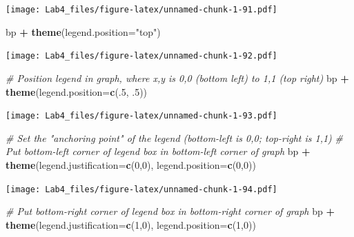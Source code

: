 \documentclass[]{article}
\newenvironment{Shaded}{\begin{snugshade}}{\end{snugshade}}
\newcommand{\KeywordTok}[1]{\textcolor[rgb]{0.13,0.29,0.53}{\textbf{#1}}}
\newcommand{\DataTypeTok}[1]{\textcolor[rgb]{0.13,0.29,0.53}{#1}}
\newcommand{\DecValTok}[1]{\textcolor[rgb]{0.00,0.00,0.81}{#1}}
\newcommand{\StringTok}[1]{\textcolor[rgb]{0.31,0.60,0.02}{#1}}
\newcommand{\CommentTok}[1]{\textcolor[rgb]{0.56,0.35,0.01}{\textit{#1}}}
\newcommand{\OperatorTok}[1]{\textcolor[rgb]{0.81,0.36,0.00}{\textbf{#1}}}
\newcommand{\NormalTok}[1]{#1}
\begin{document}
\texttt{[image: Lab4\_files/figure-latex/unnamed-chunk-1-91.pdf]}

\begin{Shaded}
\begin{Highlighting}[]
\NormalTok{bp }\OperatorTok{+}\StringTok{ }\KeywordTok{theme}\NormalTok{(}\DataTypeTok{legend.position=}\StringTok{"top"}\NormalTok{)}
\end{Highlighting}
\end{Shaded}

\texttt{[image: Lab4\_files/figure-latex/unnamed-chunk-1-92.pdf]}

\begin{Shaded}
\begin{Highlighting}[]
\CommentTok{# Position legend in graph, where x,y is 0,0 (bottom left) to 1,1 (top right)}
\NormalTok{bp }\OperatorTok{+}\StringTok{ }\KeywordTok{theme}\NormalTok{(}\DataTypeTok{legend.position=}\KeywordTok{c}\NormalTok{(.}\DecValTok{5}\NormalTok{, .}\DecValTok{5}\NormalTok{))}
\end{Highlighting}
\end{Shaded}

\texttt{[image: Lab4\_files/figure-latex/unnamed-chunk-1-93.pdf]}

\begin{Shaded}
\begin{Highlighting}[]
\CommentTok{# Set the "anchoring point" of the legend (bottom-left is 0,0; top-right is 1,1)}
\CommentTok{# Put bottom-left corner of legend box in bottom-left corner of graph}
\NormalTok{bp }\OperatorTok{+}\StringTok{ }\KeywordTok{theme}\NormalTok{(}\DataTypeTok{legend.justification=}\KeywordTok{c}\NormalTok{(}\DecValTok{0}\NormalTok{,}\DecValTok{0}\NormalTok{), }\DataTypeTok{legend.position=}\KeywordTok{c}\NormalTok{(}\DecValTok{0}\NormalTok{,}\DecValTok{0}\NormalTok{))}
\end{Highlighting}
\end{Shaded}

\texttt{[image: Lab4\_files/figure-latex/unnamed-chunk-1-94.pdf]}

\begin{Shaded}
\begin{Highlighting}[]
\CommentTok{# Put bottom-right corner of legend box in bottom-right corner of graph}
\NormalTok{bp }\OperatorTok{+}\StringTok{ }\KeywordTok{theme}\NormalTok{(}\DataTypeTok{legend.justification=}\KeywordTok{c}\NormalTok{(}\DecValTok{1}\NormalTok{,}\DecValTok{0}\NormalTok{), }\DataTypeTok{legend.position=}\KeywordTok{c}\NormalTok{(}\DecValTok{1}\NormalTok{,}\DecValTok{0}\NormalTok{))}
\end{Highlighting}
\end{Shaded}
\end{document}
